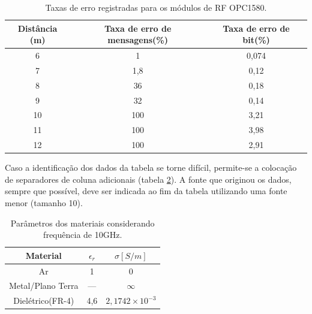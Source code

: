 \documentclass[repeatfields,xlists,xpacks,oneside]{ufrgscca}
\begin{document}
\begin{table}[htb]
 \begin{center}
  \caption{Taxas de erro registradas para os módulos de RF OPC1580.}\label{standarttable}
  \begin{tabular}{c|cc}
  \hline
  Distância (m) & Taxa de erro de mensagens(\%) & Taxa de erro de bit(\%)\\
  \hline
  6	& 1 	& 0,074\\
  7	& 1,8	& 0,12\\
  8 	& 36  	& 0,18\\
  9	& 32  	& 0,14\\
  10	& 100	& 3,21\\
  11	& 100	& 3,98\\
  12	& 100	& 2,91\\
  \hline
  \end{tabular}
 \end{center}
{}
\end{table}

Caso a identificação dos dados da tabela se torne difícil, permite-se a
colocação de separadores de coluna adicionais (tabela \ref{tabvert}). A fonte que
originou os dados, sempre que possível, deve ser indicada ao fim da tabela
utilizando uma fonte menor (tamanho 10).

\begin{table}[htb]
  \begin{center}
  \caption{Parâmetros dos materiais considerando frequência de 10GHz.}\label{tabvert}
  \begin{tabular}{c|c|c}
  \hline
  Material		& $\epsilon_r$	& $\sigma[S/m]$\\
  \hline
  Ar			& 1		& 0\\
  Metal/Plano Terra 	& --- 		& $\infty$\\
  Dielétrico(FR-4) 	& 4,6		& $2,1742\times10^{-3}$\\
  \hline
  \end{tabular}
	\end{center}
{}
\end{table}
\end{document}
